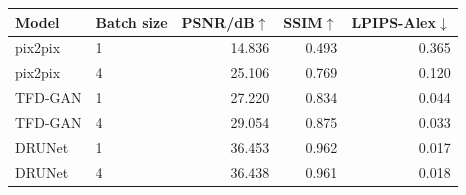 \begin{tabular}{@{}llrrr@{}}
\toprule
Model & Batch size & PSNR/dB$\uparrow$ & SSIM$\uparrow$ & LPIPS-Alex$\downarrow$\\
\midrule
pix2pix & 1 & 14.836 & 0.493 & 0.365\\
pix2pix & 4 & 25.106 & 0.769 & 0.120\\
TFD-GAN & 1 & 27.220 & 0.834 & 0.044\\
TFD-GAN & 4 & 29.054 & 0.875 & 0.033\\
DRUNet & 1 & 36.453 & 0.962 & 0.017\\
DRUNet & 4 & 36.438 & 0.961 & 0.018\\
\bottomrule
\end{tabular}
